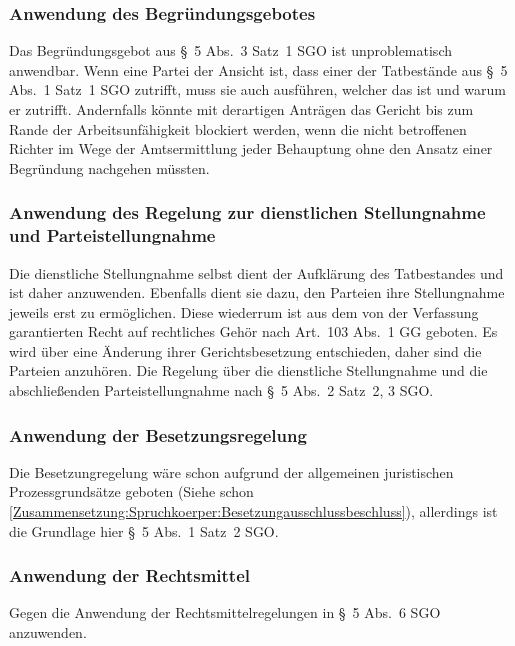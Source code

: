 \subsubsection{Anwendung des Begründungsgebotes}
\label{Zusammensetzung:Spruchkoerper:Befangenheitsvermutung:Begruendungsgebot}
Das Begründungsgebot aus \S~5 Abs.~3 Satz~1 SGO ist unproblematisch anwendbar.
Wenn eine Partei der Ansicht ist, dass einer der Tatbestände aus \S~5 Abs.~1 Satz~1 SGO zutrifft, muss sie auch ausführen, welcher das ist und warum er zutrifft.
Andernfalls könnte mit derartigen Anträgen das Gericht bis zum Rande der Arbeitsunfähigkeit blockiert werden, wenn die nicht betroffenen Richter im Wege der Amtsermittlung jeder Behauptung ohne den Ansatz einer Begründung nachgehen müssten.

\subsubsection{Anwendung des Regelung zur dienstlichen Stellungnahme und Parteistellungnahme}
\label{Zusammensetzung:Spruchkoerper:Befangenheitsvermutung:Stellungnahme}
Die dienstliche Stellungnahme selbst dient der Aufklärung des Tatbestandes und ist daher anzuwenden.
Ebenfalls dient sie dazu, den Parteien ihre Stellungnahme jeweils erst zu ermöglichen.
Diese wiederrum ist aus dem von der Verfassung garantierten Recht auf rechtliches Gehör nach Art.~103 Abs.~1 GG geboten.
Es wird über eine Änderung ihrer Gerichtsbesetzung entschieden, daher sind die Parteien anzuhören.
Die Regelung über die dienstliche Stellungnahme und die abschließenden Parteistellungnahme nach \S~5 Abs.~2 Satz~2, 3 SGO.

\subsubsection{Anwendung der Besetzungsregelung}
\label{Zusammensetzung:Spruchkoerper:Befangenheitsvermutung:Besetzung}
Die Besetzungregelung wäre schon aufgrund der allgemeinen juristischen Prozessgrundsätze geboten (Siehe schon \ref{Zusammensetzung:Spruchkoerper:Besetzungausschlussbeschluss}), allerdings ist die Grundlage hier \S~5 Abs.~1 Satz~2 SGO.

\subsubsection{Anwendung der Rechtsmittel}
\label{Zusammensetzung:Spruchkoerper:Befangenheitsvermutung:Rechtsmittel}
Gegen die Anwendung der Rechtsmittelregelungen in \S~5 Abs.~6 SGO anzuwenden.

